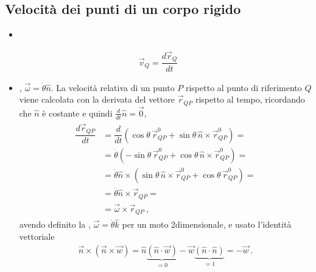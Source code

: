 \documentclass[letterpaper,10pt,italian]{jupyterBook}
\begin{document}
\subsection{Velocità dei punti di un corpo rigido}
\label{\detokenize{ch/mechanics/kinematics-rigid:velocita-dei-punti-di-un-corpo-rigido}}\begin{itemize}
\item {} 
\sphinxAtStartPar
{}

\end{itemize}
\begin{equation*}
\begin{split}\vec{v}_Q = \dfrac{d \vec{r}_Q}{dt}\end{split}
\end{equation*}\begin{itemize}
\item {} 
\sphinxAtStartPar
{}, \(\vec{\omega} = \dot{\theta} \hat{n}\). La velocità relativa di un punto \(P\) rispetto al punto di riferimento \(Q\) viene calcolata con la derivata del vettore \(\vec{r}_{QP}\) rispetto al tempo, ricordando che \(\hat{n}\) è costante e quindi \(\frac{d}{dt} \hat{n} = \vec{0}\),
\begin{equation*}
\begin{split}\begin{aligned}
    \dfrac{d \vec{r}_{QP}}{dt} 
    & = \dfrac{d}{dt} \left(  \cos \theta \, \vec{r}_{QP}^0 + \sin \theta \, \hat{n} \times \vec{r}_{QP}^0 \right) = \\
    & = \dot{\theta} \left( -\sin \theta \, \vec{r}_{QP}^0 + \cos \theta \, \hat{n} \times \vec{r}_{QP}^0 \right) = \\
    & = \dot{\theta} \hat{n} \times \left( \sin \theta \, \hat{n} \times \vec{r}_{QP}^0 + \cos \theta \, \vec{r}_{QP}^0 \right) = \\
    & = \dot{\theta} \hat{n} \times \vec{r}_{QP} = \\
    & = \vec{\omega} \times \vec{r}_{QP} \ ,
  \end{aligned}\end{split}
\end{equation*}
\sphinxAtStartPar
avendo definito la , \(\vec{\omega} = \dot{\theta} \hat{k}\) per un moto 2\sphinxhyphen{}dimensionale, e usato l’identità vettoriale
\begin{equation*}
\begin{split}\vec{n} \times (\vec{n} \times \vec{w}) = \hat{n} \underbrace{(\hat{n} \cdot \vec{w})}_{=0} - \vec{w} \underbrace{(\hat{n} \cdot \hat{n})}_{=1} = - \vec{w} \ .\end{split}
\end{equation*}
\end{itemize}
\end{document}
